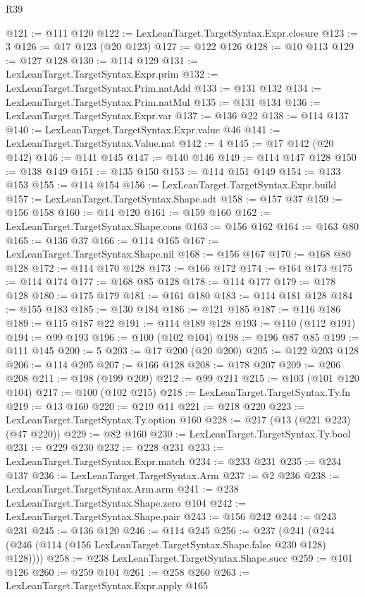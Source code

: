 \begin{lexlean}{R39}
\begin{coremodule}
@121 := @111 @120
@122 := LexLeanTarget.TargetSyntax.Expr.closure
@123 := 3
@126 := @17 @123 (@20 @123)
@127 := @122 @126
@128 := @10 @113
@129 := @127 @128
@130 := @114 @129
@131 := LexLeanTarget.TargetSyntax.Expr.prim
@132 := LexLeanTarget.TargetSyntax.Prim.natAdd
@133 := @131 @132
@134 := LexLeanTarget.TargetSyntax.Prim.natMul
@135 := @131 @134
@136 := LexLeanTarget.TargetSyntax.Expr.var
@137 := @136 @22
@138 := @114 @137
@140 := LexLeanTarget.TargetSyntax.Expr.value @46
@141 := LexLeanTarget.TargetSyntax.Value.nat
@142 := 4
@145 := @17 @142 (@20 @142)
@146 := @141 @145
@147 := @140 @146
@149 := @114 @147 @128
@150 := @138 @149
@151 := @135 @150
@153 := @114 @151 @149
@154 := @133 @153
@155 := @114 @154
@156 := LexLeanTarget.TargetSyntax.Expr.build
@157 := LexLeanTarget.TargetSyntax.Shape.adt
@158 := @157 @37
@159 := @156 @158
@160 := @14 @120
@161 := @159 @160
@162 := LexLeanTarget.TargetSyntax.Shape.cons
@163 := @156 @162
@164 := @163 @80
@165 := @136 @37
@166 := @114 @165
@167 := LexLeanTarget.TargetSyntax.Shape.nil
@168 := @156 @167
@170 := @168 @80 @128
@172 := @114 @170 @128
@173 := @166 @172
@174 := @164 @173
@175 := @114 @174
@177 := @168 @85 @128
@178 := @114 @177
@179 := @178 @128
@180 := @175 @179
@181 := @161 @180
@183 := @114 @181 @128
@184 := @155 @183
@185 := @130 @184
@186 := @121 @185
@187 := @116 @186
@189 := @115 @187 @22
@191 := @114 @189 @128
@193 := @110 (@112 @191)
@194 := @99 @193
@196 := @100 (@102 @104)
@198 := @196 @87 @85
@199 := @111 @145
@200 := 5
@203 := @17 @200 (@20 @200)
@205 := @122 @203 @128
@206 := @114 @205
@207 := @166 @128
@208 := @178 @207
@209 := @206 @208
@211 := @198 (@199 @209)
@212 := @99 @211
@215 := @103 (@101 @120 @104)
@217 := @100 (@102 @215)
@218 := LexLeanTarget.TargetSyntax.Ty.fn
@219 := @13 @160
@220 := @219 @11
@221 := @218 @220
@223 := LexLeanTarget.TargetSyntax.Ty.option @160
@228 := @217 (@13 (@221 @223) (@47 @220))
@229 := @82 @160
@230 := LexLeanTarget.TargetSyntax.Ty.bool
@231 := @229 @230
@232 := @228 @231
@233 := LexLeanTarget.TargetSyntax.Expr.match
@234 := @233 @231
@235 := @234 @137
@236 := LexLeanTarget.TargetSyntax.Arm
@237 := @2 @236
@238 := LexLeanTarget.TargetSyntax.Arm.arm
@241 := @238 LexLeanTarget.TargetSyntax.Shape.zero @104
@242 := LexLeanTarget.TargetSyntax.Shape.pair
@243 := @156 @242
@244 := @243 @231
@245 := @136 @120
@246 := @114 @245
@256 := @237
    (@241 (@244 (@246 (@114 (@156 LexLeanTarget.TargetSyntax.Shape.false @230 @128) @128))))
@258 := @238 LexLeanTarget.TargetSyntax.Shape.succ
@259 := @101 @126
@260 := @259 @104
@261 := @258 @260
@263 := LexLeanTarget.TargetSyntax.Expr.apply @165

\end{coremodule}
\end{lexlean}
